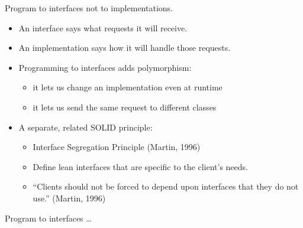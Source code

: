 \documentclass{beamer}
\begin{document}
\begin{frame}{Program to interfaces not to implementations.}
    \begin{itemize}
        \item An interface says what requests it will receive.
        \item An implementation says how it will handle those requests.
        \item Programming to interfaces adds polymorphism:
            \begin{itemize}
                \item it lets us change an implementation even at runtime
                \item it lets us send the same request to different classes
            \end{itemize}
        \item A separate, related SOLID principle:
            \begin{itemize}
                \item Interface Segregation Principle (Martin, 1996)
                \item Define lean interfaces that are specific to the client's needs.
                \item ``Clients should not be forced to depend upon interfaces that they do not use.'' (Martin, 1996)
            \end{itemize}
    \end{itemize}
\end{frame}

\begin{frame}{Program to interfaces \ldots}
    \begin{columns}
        \column{\dimexpr\paperwidth-40pt}
        
    \end{columns}
\end{frame}
\end{document}

